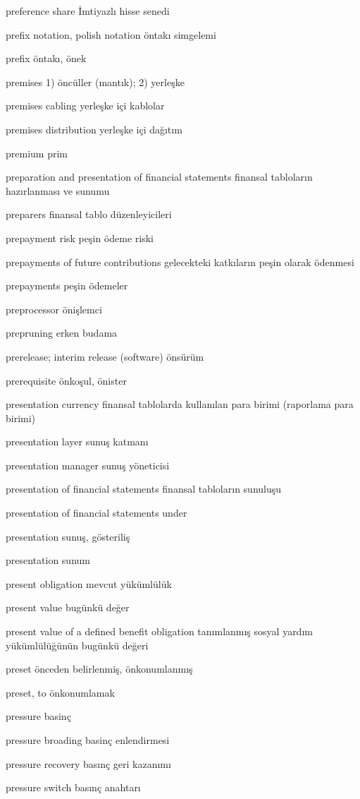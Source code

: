 \documentclass[12pt,fleqn]{article}\usepackage{../../common}
\begin{document}
preference share İmtiyazlı hisse senedi

prefix notation, polish notation öntakı simgelemi

prefix öntakı, önek

premises 1) öncüller (mantık); 2) yerleşke

premises cabling yerleşke içi kablolar

premises distribution yerleşke içi dağıtım

premium prim

preparation and presentation of financial statements finansal tabloların hazırlanması ve sunumu

preparers finansal tablo düzenleyicileri

prepayment risk peşin ödeme riski

prepayments of future contributions gelecekteki katkıların peşin olarak ödenmesi

prepayments peşin ödemeler

preprocessor önişlemci

prepruning erken budama

prerelease; interim release (software) önsürüm

prerequisite önkoşul, önister

presentation currency finansal tablolarda kullanılan para birimi (raporlama para birimi)

presentation layer sunuş katmanı

presentation manager sunuş yöneticisi

presentation of financial statements finansal tabloların sunuluşu

presentation of financial statements under

presentation sunuş, gösteriliş

presentation sunum

present obligation mevcut yükümlülük

present value bugünkü değer

present value of a defined benefit obligation tanımlanmış sosyal yardım yükümlülüğünün bugünkü değeri

preset önceden belirlenmiş, önkonumlanmış

preset, to önkonumlamak

pressure basinç

pressure broading basinç enlendirmesi

pressure recovery basınç geri kazanımı

pressure switch basınç anahtarı
\end{document}
